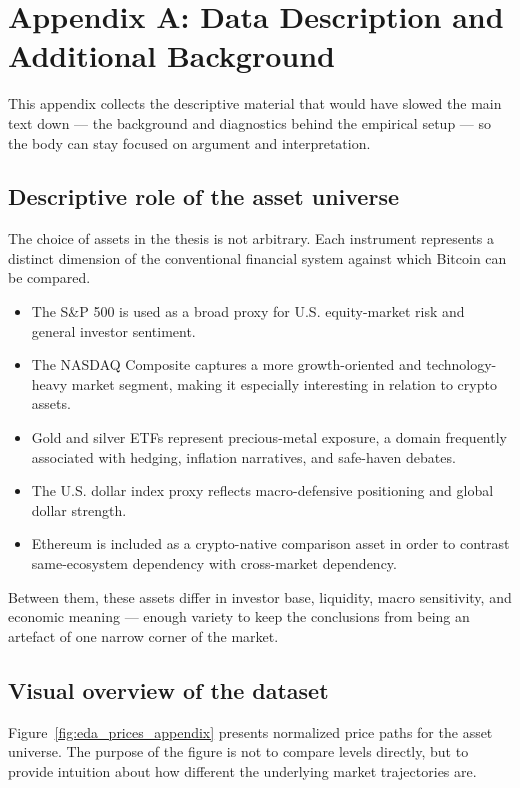 ﻿\section{Appendix A: Data Description and Additional Background}

This appendix collects the descriptive material that would have slowed the main text down --- the background and diagnostics behind the empirical setup --- so the body can stay focused on argument and interpretation.

\subsection{Descriptive role of the asset universe}

The choice of assets in the thesis is not arbitrary. Each instrument represents a distinct dimension of the conventional financial system against which Bitcoin can be compared.

\begin{itemize}
    \item The S\&P 500 is used as a broad proxy for U.S. equity-market risk and general investor sentiment.
    \item The NASDAQ Composite captures a more growth-oriented and technology-heavy market segment, making it especially interesting in relation to crypto assets.
    \item Gold and silver ETFs represent precious-metal exposure, a domain frequently associated with hedging, inflation narratives, and safe-haven debates.
    \item The U.S. dollar index proxy reflects macro-defensive positioning and global dollar strength.
    \item Ethereum is included as a crypto-native comparison asset in order to contrast same-ecosystem dependency with cross-market dependency.
\end{itemize}

Between them, these assets differ in investor base, liquidity, macro sensitivity, and economic meaning --- enough variety to keep the conclusions from being an artefact of one narrow corner of the market.

\subsection{Visual overview of the dataset}

Figure~\ref{fig:eda_prices_appendix} presents normalized price paths for the asset universe. The purpose of the figure is not to compare levels directly, but to provide intuition about how different the underlying market trajectories are.

